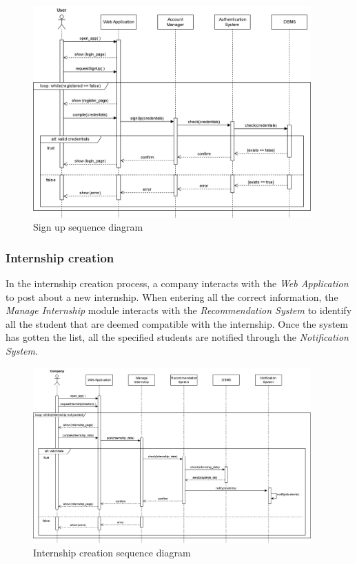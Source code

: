 \documentclass[11pt,twoside]{article}
\begin{document}
\begin{figure}[H]
\centering
\includegraphics[width=0.95\textwidth]{Images/Seq2}
\caption{Sign up sequence diagram}\label{Seq2}
\end{figure}

\newpage

		\subsubsection{Internship creation}
In the internship creation process, a company interacts with the \textit{Web Application} to post about a new internship. When entering all the correct information, the \textit{Manage Internship} module interacts with the \textit{Recommendation System} to identify all the student that are deemed compatible with the internship. Once the system has gotten the list, all the specified students are notified through the \textit{Notification System}.

\begin{figure}[H]
\centering
\includegraphics[width=0.95\textwidth]{Images/Seq3}
\caption{Internship creation sequence diagram}\label{Seq3}
\end{figure}
\end{document}

